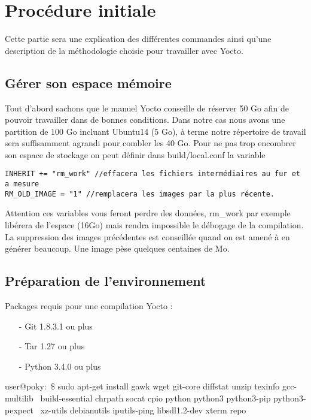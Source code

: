 
\section{Procédure initiale}
Cette partie sera une explication des différentes commandes ainsi qu’une description de la
méthodologie choisie pour travailler avec Yocto.
\subsection{Gérer son espace mémoire}

Tout d’abord sachons que le manuel Yocto conseille de réserver 50 Go afin
de pouvoir travailler dans de bonnes conditions. Dans notre cas nous avons une
partition de 100 Go incluant Ubuntu14 (5 Go), à terme notre répertoire de
travail sera suffisamment agrandi pour combler les 40 Go.
Pour ne pas trop encombrer son espace de stockage on peut définir dans build/local.conf la variable

\begin{lstlisting}
INHERIT += "rm_work" //effacera les fichiers intermédiaires au fur et a mesure
RM_OLD_IMAGE = "1" //remplacera les images par la plus récente.
\end{lstlisting}

Attention ces variables vous feront perdre des données, rm\_work par exemple
libérera de l'espace (16Go) mais rendra impossible le débogage de la compilation.
La suppression des images précédentes est conseillée quand on est amené à en
générer beaucoup. Une image pèse quelques centaines de Mo.
\subsection{Préparation de l’environnement}
Packages requis pour une compilation Yocto :

\begin{itemize}
	\item[-] Git 1.8.3.1 ou plus
	\item[-] Tar 1.27 ou plus
	\item[-] Python 3.4.0 ou plus
\end{itemize}

\begin{tcolorbox}
	user@poky:~\$ sudo apt-get install gawk wget git-core diffstat unzip texinfo gcc-multilib \
	build-essential chrpath socat cpio python python3 python3-pip python3-pexpect \
	xz-utils debianutils iputils-ping libsdl1.2-dev xterm repo
\end{tcolorbox}

